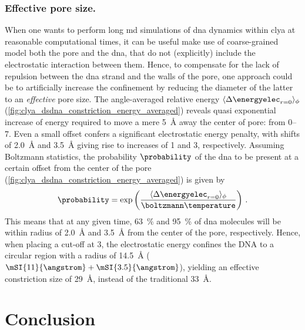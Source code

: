 \subsubsection{Effective pore size.}
%

When one wants to perform long \gls{md} simulations of \gls{dna} dynamics within \gls{clya} at reasonable
computational times, it can be useful make use of coarse-grained model both the pore and the \gls{dna}, that
do not (explicitly) include the electrostatic interaction between them. Hence, to compensate for the lack of
repulsion between the \gls{dna} strand and the walls of the pore, one approach could be to artificially
increase the confinement by reducing the diameter of the latter to an \emph{effective} pore size. The
angle-averaged relative energy $\langle \Delta \energyelec_{r=0} \rangle_{\phi}$
(\cref{fig:clya_dsdna_constriction_energy_averaged}) reveals quasi exponential increase of energy required to
move a mere \SI{5}{\angstrom} away the center of pore: from \SIrange{0}{7}{\kT}. Even a small offset confers a
significant electrostatic energy penalty, with shifts of \SI{2.0}{\angstrom} and \SI{3.5}{\angstrom} giving
rise to increases of \SI{1}{\kT} and \SI{3}{\kT}, respectively. Assuming Boltzmann statistics, the probability
$\probability$ of the \gls{dna} to be present at a certain offset from the center of the pore
(\cref{fig:clya_dsdna_constriction_energy_averaged}) is given by 
%
\begin{align}
  \probability = \exp{
    \left( \dfrac{\langle \Delta \energyelec_{r=0} \rangle_{\phi}}{\boltzmann\temperature} \right)
    }
    \text{  .}
\end{align}
%
This means that at any given time, \SI{63}{\percent} and \SI{95}{\percent} of \gls{dna} molecules will be
within radius of \SI{2.0}{\angstrom} and \SI{3.5}{\angstrom} from the center of the pore, respectively. Hence,
when placing a cut-off at \SI{3}{\kT}, the electrostatic energy confines the DNA to a circular region with a
radius of \SI{14.5}{\angstrom} ($\mSI{11}{\angstrom} + \mSI{3.5}{\angstrom}$), yielding an effective
constriction size of \SI{29}{\angstrom}, instead of the traditional \SI{33}{\angstrom}.


\section{Conclusion}
%
\label{sec:elec:conclusion}
%

